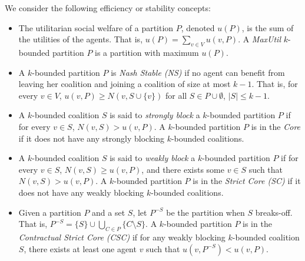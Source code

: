 \documentclass[sigconf,anonymous]{aamas}
\begin{document}
We consider the following efficiency or stability concepts: %
\begin{itemize}
    \item The utilitarian social welfare of a partition $P$, denoted $u(P)$, is the sum of the utilities of the agents. That is, $u(P) = \sum\limits_{v\in V} u(v,P)$.
    A \emph{MaxUtil} $k$-bounded partition $P$ is a partition with maximum $u(P)$.
    \item A $k$-bounded partition $P$ is \emph{Nash Stable (NS)} if no agent can benefit from leaving her coalition and joining a coalition of size at most $k-1$. That is, for every $v\in V$, $u(v,P)\geq N(v,S\cup \{v\})$ for all $S \in P \cup \emptyset$, $|S| \leq k-1$.
    \item A $k$-bounded coalition $S$ is said to \emph{strongly block} a $k$-bounded partition $P$ if for every $v \in S$, $N(v,S)>u(v,P)$.
    A $k$-bounded partition $P$ is in the \emph{Core} if it does not have any strongly blocking $k$-bounded coalitions.
    \item A $k$-bounded coalition $S$ is said to \emph{weakly block} a $k$-bounded partition $P$ if for every $v \in S$, $N(v,S)\geq u(v,P)$, and there exists some $v \in S$ such that $N(v,S) > u(v,P)$.
    A $k$-bounded partition $P$ is in the \emph{Strict Core (SC)} if it does not have any weakly blocking $k$-bounded coalitions.
    \item Given a partition $P$ and a set $S$, let $P^{-S}$ be the partition when $S$ breaks-off. That is, $P^{-S}=\{S\} \cup \bigcup\limits_{C\in P} \{C\setminus S\}$.
    A $k$-bounded partition $P$ is in the \emph{Contractual Strict Core (CSC)} if for any weakly blocking $k$-bounded coalition $S$, there exists at least one agent $v$ such that $u(v,P^{-S})<u(v,P)$.
\end{itemize}




\end{document}
